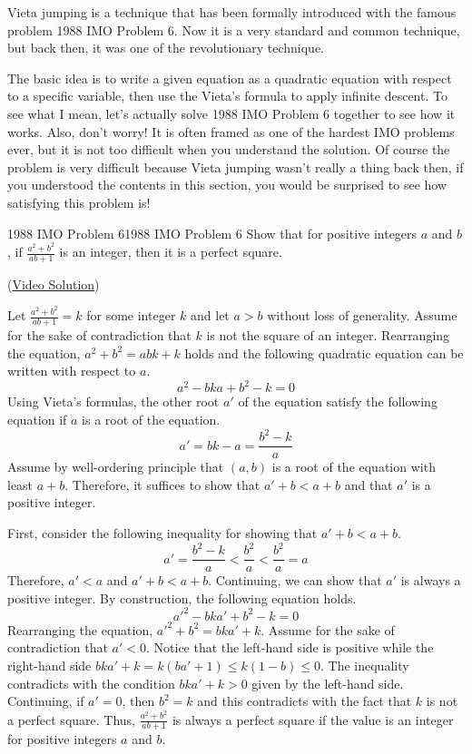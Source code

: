 \documentclass[../../../main.tex]{subfiles}
\begin{document}
Vieta jumping is a technique that has been formally introduced
with the famous problem 1988 IMO Problem 6. Now it is a very
standard and common technique, but back then, it was one of the
revolutionary technique.

The basic idea is to write a given equation as a quadratic
equation with respect to a specific variable, then use the
Vieta's formula to apply infinite descent. To see what I mean,
let's actually solve 1988 IMO Problem 6 together to see how it
works. Also, don't worry! It is often framed as one of the
hardest IMO problems ever, but it is not too difficult when you
understand the solution. Of course the problem is very difficult
because Vieta jumping wasn't really a thing back then, if you
understood the contents in this section, you would be surprised
to see how satisfying this problem is!

\begin{problem}{1988 IMO Problem 6}{1988 IMO Problem 6}
Show that for positive integers $a$ and $b$, if
$\frac{a^2 + b^2}{ab + 1}$ is an integer, then it is a perfect
square.
\end{problem}
(\href{https://youtu.be/rU1e7ttQmh4}{Video Solution})
\begin{solution}
Let $\frac{a^2 + b^2}{ab + 1} = k$ for some integer $k$ and let
$a > b$ without loss of generality. Assume for the sake of
contradiction that $k$ is not the square of an integer.
Rearranging the equation, $a^2 + b^2 = abk + k$ holds and the
following quadratic equation can be written with respect to $a$.
\[
a^2 - bka + b^2 - k = 0
\]
Using Vieta's formulas, the other root $a'$ of the equation satisfy
the following equation if $a$ is a root of the equation.
\[
a'
= bk - a
= \frac{b^2 - k}{a}
\]
Assume by well-ordering principle that $(a, b)$ is a root of the
equation with least $a + b$. Therefore, it suffices to show that
$a' + b < a + b$ and that $a'$ is a positive integer.

First, consider the following inequality for showing that
$a' + b < a + b$.
\[
a'
= \frac{b^2 - k}{a}
< \frac{b^2}{a}
< \frac{b^2}{a}
= a
\]
Therefore, $a' < a$ and $a' + b < a + b$. Continuing, we can show
that $a'$ is always a positive integer. By construction, the following
equation holds.
\[
a'^2 - bka' + b^2 - k = 0
\]
Rearranging the equation, $a'^2 + b^2 = bka' + k$. Assume for the
sake of contradiction that $a' < 0$. Notice that the left-hand
side is positive while the right-hand side $bka' + k = k(ba' + 1) \leq
k(1 - b) \leq 0$. The inequality contradicts with the condition
$bka' + k > 0$ given by the left-hand side. Continuing, if $a' = 0$,
then $b^2 = k$ and this contradicts with the fact that $k$ is not
a perfect square. Thus, $\frac{a^2 + b^2}{ab + 1}$ is always a
perfect square if the value is an integer for positive integers
$a$ and $b$.
\end{solution}
\end{document}
